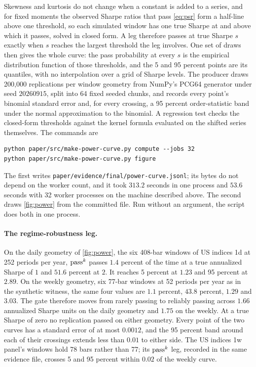 Skewness and kurtosis do not change when a constant is added to a series, and for fixed moments the observed Sharpe ratios that pass \cref{eq:psr} form a half-line above one threshold, so each simulated window has one true Sharpe at and above which it passes, solved in closed form. A leg therefore passes at true Sharpe $s$ exactly when $s$ reaches the largest threshold the leg involves. One set of draws then gives the whole curve: the pass probability at every $s$ is the empirical distribution function of those thresholds, and the 5 and 95 percent points are its quantiles, with no interpolation over a grid of Sharpe levels. The producer draws 200{,}000 replications per window geometry from NumPy's PCG64 generator under seed $20260915$, split into 64 fixed seeded chunks, and records every point's binomial standard error and, for every crossing, a 95 percent order-statistic band under the normal approximation to the binomial. A regression test checks the closed-form thresholds against the kernel formula evaluated on the shifted series themselves. The commands are
\begin{verbatim}
python paper/src/make-power-curve.py compute --jobs 32
python paper/src/make-power-curve.py figure
\end{verbatim}
The first writes \texttt{paper/evidence/final/power-curve.jsonl}; its bytes do not depend on the worker count, and it took $313.2$ seconds in one process and $53.6$ seconds with 32 worker processes on the machine described above. The second draws \cref{fig:power} from the committed file. Run without an argument, the script does both in one process.

\paragraph{The regime-robustness leg.} On the daily geometry of \cref{fig:power}, the six 408-bar windows of US indices 1d at 252 periods per year, $\text{pass}^{k}$ passes $1.4$ percent of the time at a true annualized Sharpe of $1$ and $51.6$ percent at $2$. It reaches 5 percent at $1.23$ and 95 percent at $2.89$. On the weekly geometry, six 77-bar windows at 52 periods per year as in the synthetic witness, the same four values are $1.1$ percent, $43.8$ percent, $1.29$ and $3.03$. The gate therefore moves from rarely passing to reliably passing across $1.66$ annualized Sharpe units on the daily geometry and $1.75$ on the weekly. At a true Sharpe of zero no replication passed on either geometry. Every point of the two curves has a standard error of at most $0.0012$, and the 95 percent band around each of their crossings extends less than $0.01$ to either side. The US indices 1w panel's windows hold 78 bars rather than 77; its $\text{pass}^{k}$ leg, recorded in the same evidence file, crosses 5 and 95 percent within $0.02$ of the weekly curve.

